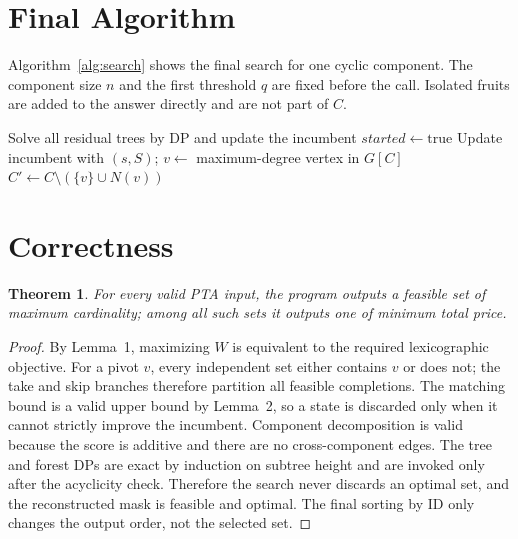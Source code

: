 \documentclass[12pt,a4paper]{report}
\newtheorem{theorem}{Theorem}
\begin{document}
\section{Final Algorithm}

Algorithm~\ref{alg:search} shows the final search for one cyclic component.
The component size $n$ and the first threshold $q$ are fixed before the call.
Isolated fruits are added to the answer directly and are not part of $C$.

\begin{algorithm}[H]
\caption{Structural branch and bound (v8, one cyclic component)}
\label{alg:search}
\begin{algorithmic}[1]
\State\Return\EndIf
{}
    \State Solve all residual trees by DP and update the incumbent
    \State\Return
  \EndIf
  \State $\mathit{started}\gets\mathrm{true}$
\EndIf
{}\State Update incumbent with $(s,S)$; \Return\EndIf
\State $v\gets$ maximum-degree vertex in $G[C]$
\State $C'\gets C\setminus(\{v\}\cup N(v))$
\State {}
\State {}
\EndProcedure
\end{algorithmic}
\end{algorithm}

\section{Correctness}

\begin{theorem}
For every valid PTA input, the program outputs a feasible set of maximum
cardinality; among all such sets it outputs one of minimum total price.
\end{theorem}

\begin{proof}
By Lemma~1, maximizing $W$ is equivalent to the required lexicographic
objective.  For a pivot $v$, every independent set either contains $v$ or does
not; the take and skip branches therefore partition all feasible completions.
The matching bound is a valid upper bound by Lemma~2, so a state is discarded
only when it cannot strictly improve the incumbent.  Component decomposition is
valid because the score is additive and there are no cross-component edges.
The tree and forest DPs are exact by induction on subtree height and are invoked
only after the acyclicity check.  Therefore the search never discards an
optimal set, and the reconstructed mask is feasible and optimal.  The final
sorting by ID only changes the output order, not the selected set.
\end{proof}
\end{document}
